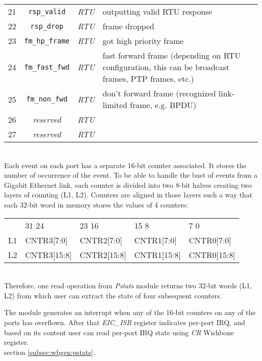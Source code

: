 {\begin{tabular}{|p{1cm}|c|c|p{9cm}|}
 21 & \texttt{rsp\_valid} & \emph{RTU} & outputting valid RTU response\\
 22 & \texttt{rsp\_drop} & \emph{RTU} & frame dropped\\
 23 & \texttt{fm\_hp\_frame} & \emph{RTU} & got high priority frame\\
 24 & \texttt{fm\_fast\_fwd} & \emph{RTU} & fast forward frame (depending on RTU
  configuration, this can be broadcast frames, PTP frames, etc.)\\
 25 & \texttt{fm\_non\_fwd} & \emph{RTU} & don't forward frame (recognized
  link-limited frame, e.g. BPDU)\\
 26 & \emph{reserved} & \emph{RTU} & \\
 27 & \emph{reserved} & \emph{RTU} & \\
 \hline
\end{tabular}
}\\

Each event on each port has a separate 16-bit counter associated. It stores the
number of occurrence of the event. To be able to handle the bust of events from
a Gigabit Ethernet link, each counter is divided into two 8-bit halves creating
two layers of counting (L1, L2). Counters are aligned in those layers such a way
that each 32-bit word in memory stores the values of 4 counters:\\

\begin{tabular}{p{0.5cm}|p{2.5cm}|p{2.5cm}|p{2.5cm}|p{2.5cm}|}
  & {\scriptsize 31} \hfill {\scriptsize 24} & {\scriptsize 23} \hfill {\scriptsize 16} & 
  {\scriptsize 15} \hfill {\scriptsize 8} & {\scriptsize 7} \hfill {\scriptsize 0}\\
  \cline{2-5}
  L1 & \cellcolor{gray!25}CNTR3[7:0] & \cellcolor{gray!25}CNTR2[7:0] & 
  \cellcolor{gray!25}CNTR1[7:0] & \cellcolor{gray!25}CNTR0[7:0]\\
  \cline{2-5}
  L2 & \cellcolor{gray!25}CNTR3[15:8] & \cellcolor{gray!25}CNTR2[15:8] & 
  \cellcolor{gray!25}CNTR1[15:8] & \cellcolor{gray!25}CNTR0[15:8]\\
  \cline{2-5}
\end{tabular}\\

Therefore, one read operation from \emph{Pstats} module returns two 32-bit words
(L1, L2) from which user can extract the state of four subsequent counters.

The module generates an interrupt when any of the 16-bit counters on any of the
ports has overflown. After that \emph{EIC\_ISR} register indicates per-port IRQ,
and based on its content user can read per-port IRQ state using \emph{CR}
Wishbone register.\\

 section \ref{subsec:wbgen:pstats}.
